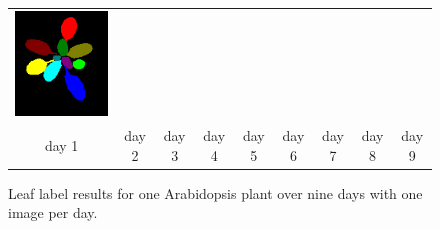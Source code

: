 \begin{figure}[h]
\begin{centering}
\begin{tabular}{@{}c@{} c@{} c@{} c@{} c@{} c@{} c@{} c@{} c@{}}
\includegraphics[width=.11\textwidth]{Figures/labelExample/plant_1_day_9_num_13.png}\\
  day 1 & day 2 & day 3 & day 4 & day 5 & day 6 & day 7 & day 8 & day 9 \\
\end{tabular}
\caption{Leaf label results for one Arabidopsis plant over nine days with one image per day. }
\label{fig:LabelExample}
\end{centering}
\end{figure}


%
















